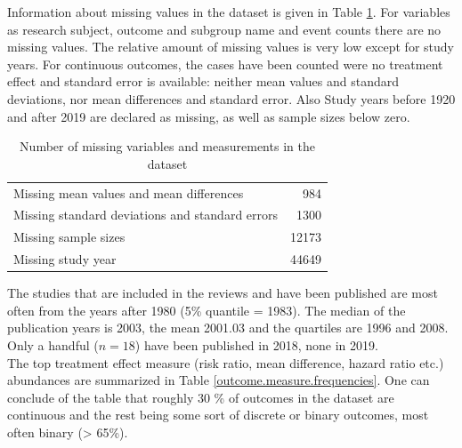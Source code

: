 \documentclass[11pt,a4paper,twoside]{book}\usepackage[]{graphicx}\usepackage[]{color}
\begin{document}
Information about missing values in the dataset is given in Table \ref{missing}. For variables as research subject, outcome and subgroup name and event counts there are no missing values. The relative amount of missing values is very low except for study years. For continuous outcomes, the cases have been counted were no treatment effect and standard error is available: neither mean values and standard deviations, nor mean differences and standard error. Also Study years before 1920 and after 2019 are declared as missing, as well as sample sizes below zero.

\begin{table}[ht]
\centering
\begingroup\footnotesize
\begin{tabular}{lr}
  \hline
  \hline
Missing mean values and mean differences & 984 \\ 
  Missing standard deviations and standard errors & 1300 \\ 
  Missing sample sizes & 12173 \\ 
  Missing study year & 44649 \\ 
   \hline
\end{tabular}
\endgroup
\caption{Number of missing variables and measurements in the dataset} 
\label{missing}
\end{table}


The studies that are included in the reviews and have been published are most often from the years after 1980 (5\% quantile = 1983). The median of the publication years is 2003, the mean 2001.03 and the quartiles are 1996 and 2008. Only a handful ($n = 18$) have been published in 2018, none in 2019. \\
The top treatment effect measure (risk ratio, mean difference, hazard ratio etc.) abundances are summarized in Table \ref{outcome.measure.frequencies}. One can conclude of the table that roughly 30 \% of outcomes in the dataset are continuous and the rest being some sort of discrete or binary outcomes, most often binary (> 65\%).
\end{document}
